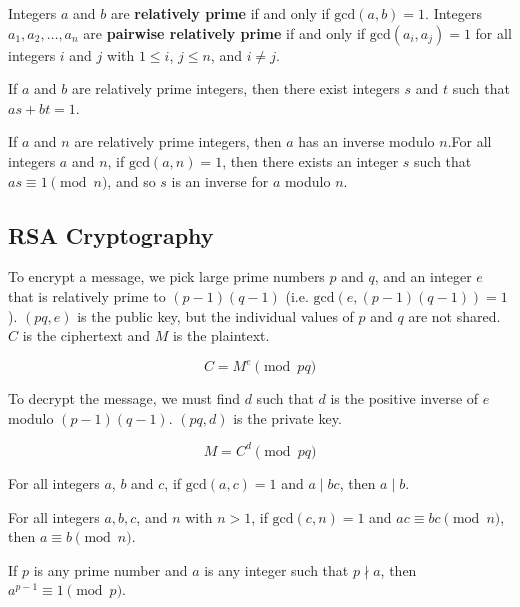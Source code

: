 \begin{definition}
    Integers $a$ and $b$ are \textbf{relatively prime} if and only if $\text{gcd}(a,b)=1$. Integers $a_1,a_2,\ldots,a_n$ are \textbf{pairwise relatively prime} if and only if $\text{gcd}(a_i,a_j)=1$ for all integers $i$ and $j$ with $1 \leq i$, $j\leq n$, and $i\neq j$.
\end{definition}

\begin{corollary}
    If $a$ and $b$ are relatively prime integers, then there exist integers $s$ and $t$ such that $as+bt=1$.
\end{corollary}

\begin{corollary}
    If $a$ and $n$ are relatively prime integers, then $a$ has an inverse modulo $n$.For all integers $a$ and $n$, if $\text{gcd}(a,n)=1$, then there exists an integer $s$ such that $as\equiv 1 \pmod n$, and so $s$ is an inverse for $a$ modulo $n$.
\end{corollary}

\subsection{RSA Cryptography}

To encrypt a message, we pick large prime numbers $p$ and $q$, and an integer $e$ that is relatively prime to $(p-1)(q-1)$ (i.e. $\text{gcd}(e,(p-1)(q-1))=1$). $(pq,e)$ is the public key, but the individual values of $p$ and $q$ are not shared. $C$ is the ciphertext and $M$ is the plaintext.

$$ C = M^e \pmod {pq} $$

To decrypt the message, we must find $d$ such that $d$ is the positive inverse of $e$ modulo $(p-1)(q-1)$. $(pq,d)$ is the private key.

$$ M = C^d \pmod {pq} $$

\begin{theorem}
    For all integers $a$, $b$ and $c$, if $\text{gcd}(a,c)=1$ and $a\mid bc$, then $a\mid b$.
\end{theorem}

\begin{theorem}
    For all integers $a,b,c$, and $n$ with $n>1$, if $\text{gcd}(c,n)=1$ and $ac \equiv bc \pmod n$, then $a \equiv b \pmod n$.
\end{theorem}

\begin{theorem}
    If $p$ is any prime number and $a$ is any integer such that $p \nmid a$, then $a^{p-1} \equiv 1 \pmod p$.
\end{theorem}

